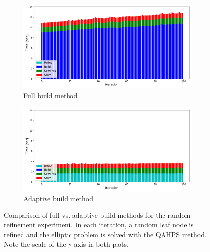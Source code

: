 \begin{figure}
    \centering
    \begin{subfigure}[t]{1\textwidth}
        \includegraphics[width=\textwidth, clip=true, trim={10 10 10 10}]{figures/full-stacked-bar-no-title.pdf}
        \caption{Full build method}
    \end{subfigure}
    \begin{subfigure}[t]{1\textwidth}
        \includegraphics[width=\textwidth, clip=true, trim={10 10 10 10}]{figures/adaptive-stacked-bar-no-title.pdf}
        \caption{Adaptive build method}
    \end{subfigure}
    \caption{Comparison of full vs. adaptive build methods for the random refinement experiment. In each iteration, a random leaf node is refined and the elliptic problem is solved with the QAHPS method. Note the scale of the y-axis in both plots.}
    \label{fig:full-vs-adaptive-time-comparison}
\end{figure}